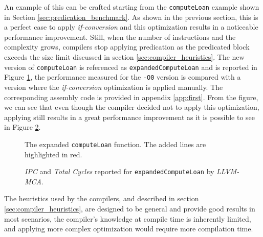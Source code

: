 An example of this can be crafted starting from the \texttt{computeLoan} example shown in Section \ref{sec:predication_benchmark}. As shown in the previous section, this is a perfect case to apply \textit{if-conversion} and this optimization results in a noticeable performance improvement.
Still, when the number of instructions and the complexity grows, compilers stop applying predication as the predicated block exceeds the size limit discussed in section \ref{sec:compiler_heuristics}. The new version of  \texttt{computeLoan} is referenced as \texttt{expandedComputeLoan} and is reported in Figure \ref{lst:expanded_compute_loan}, the performance measured for the \texttt{-O0} version is compared with a version where the \textit{if-conversion} optimization is applied manually. The corresponding assembly code is provided in appendix \ref{app:first}. From the figure, we can see that even though the compiler decided not to apply this optimization, applying still results in a great performance improvement as it is possible to see in Figure \ref{fig:compute_loan_ipc}.

\begin{figure}[h]
    
    \caption{The expanded \texttt{computeLoan} function. The added lines are highlighted in red.}
    \label{lst:expanded_compute_loan}
\end{figure}

\begin{figure}[h]
    
    \caption{\textit{IPC} and \textit{Total Cycles} reported for \texttt{expandedComputeLoan} by \textit{LLVM-MCA}.}
    \label{fig:compute_loan_ipc}
\end{figure}

The heuristics used by the compilers, and described in section \ref{sec:compiler_heuristics}, are designed to be general and provide good results in most scenarios, the compiler's knowledge at compile time is inherently limited, and applying more complex optimization would require more compilation time.

\newpage
